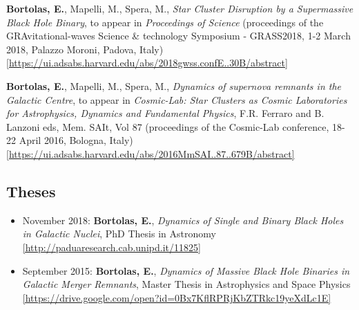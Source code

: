 \begin{etaremune}

\item {\bf Bortolas, E.}, Mapelli, M., Spera, M., {\it Star Cluster Disruption by a Supermassive Black Hole Binary}, to appear in {\it Proceedings of Science}  (proceedings of the  GRAvitational-waves Science \& technology Symposium - GRASS2018, 1-2 March 2018, Palazzo Moroni, Padova, Italy) \\ \href{https://ui.adsabs.harvard.edu/abs/2018gwss.confE..30B/abstract}{\scriptsize [https://ui.adsabs.harvard.edu/abs/2018gwss.confE..30B/abstract]}




\item {\bf Bortolas, E.}, Mapelli, M., Spera, M., {\it Dynamics of supernova remnants in the Galactic Centre}, to appear in {\it Cosmic-Lab: Star Clusters as Cosmic Laboratories for Astrophysics, Dynamics and Fundamental Physics}, F.R. Ferraro and B. Lanzoni eds, Mem. SAIt, Vol 87 (proceedings of the Cosmic-Lab conference, 18-22 April 2016, Bologna, Italy)\\ \href{https://ui.adsabs.harvard.edu/abs/2016MmSAI..87..679B/abstract}{\scriptsize [https://ui.adsabs.harvard.edu/abs/2016MmSAI..87..679B/abstract]}



\end{etaremune}

\subsection*{Theses}


\begin{itemize}
   \item {\normalfont November 2018:} {\bf Bortolas, E.}, {\it Dynamics of Single and Binary Black Holes in Galactic Nuclei}, PhD Thesis in Astronomy \href{http://paduaresearch.cab.unipd.it/11825}{\scriptsize [http://paduaresearch.cab.unipd.it/11825]}
  \item {\normalfont September 2015:} {\bf Bortolas, E.}, {\it Dynamics of Massive Black Hole Binaries in Galactic Merger Remnants}, Master Thesis in Astrophysics and Space Physics \href{https://drive.google.com/open?id=0Bx7KflRPRjKbZTRkc19yeXdLc1E}{\scriptsize [https://drive.google.com/open?id=0Bx7KflRPRjKbZTRkc19yeXdLc1E]}
\end{itemize}
